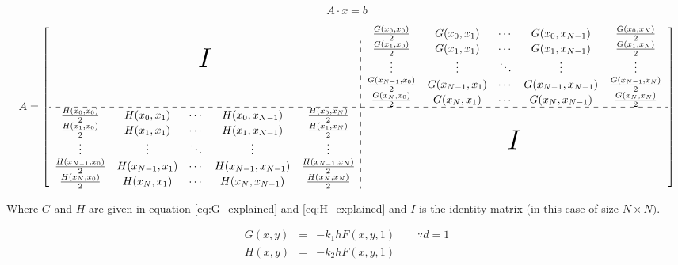 \begin{equation}
A \cdot x = b
\label{eq:equationFormat}
\end{equation}

\begin{landscape}

\begin{equation}
A = 
\left[
\begin{array}{*{5}{c}:*{5}{c}}
\multicolumn{5}{c}{\multirow{5}{*}{\Huge{$I$}}} 
& \frac{G(x_0,x_0)}{2}
& G(x_0,x_1)
& \cdots
& G(x_0,x_{N-1})
& \frac{G(x_0,x_N)}{2} \\

&&&&& \frac{G(x_1,x_0)}{2}
& G(x_1,x_1) 
& \cdots
& G(x_{1},x_{N-1}) 
& \frac{G(x_{1},x_{N})}{2} \\

&&&&& \vdots
& \vdots
& \ddots
& \vdots
& \vdots\\

&&&&& \frac{G(x_{N-1},x_0)}{2}
& G(x_{N-1},x_{1}) 
& \cdots
& G(x_{N-1},x_{N-1}) 
& \frac{G(x_{N-1},x_{N})}{2} \\

&&&&& \frac{G(x_N,x_0)}{2} 
& G(x_{N},x_{1}) 
& \cdots
& G(x_{N},x_{N-1})
& \frac{G(x_{N},x_{N})}{2} \\
 \hdashline
 
\frac{H(x_0,x_0)}{2}
& H(x_0,x_1)
& \cdots
& H(x_0,x_{N-1})
& \frac{H(x_0,x_N)}{2} &
\multicolumn{5}{c}{\multirow{5}{*}{\Huge{$I$}}}
\\

\frac{H(x_1,x_0)}{2}
& H(x_1,x_1) 
& \cdots
& H(x_{1},x_{N-1}) 
& \frac{H(x_{1},x_{N})}{2} \\

\vdots
& \vdots
& \ddots
& \vdots
& \vdots\\

\frac{H(x_{N-1},x_0)}{2}
& H(x_{N-1},x_{1}) 
& \cdots
& H(x_{N-1},x_{N-1}) 
& \frac{H(x_{N-1},x_{N})}{2} \\

\frac{H(x_N,x_0)}{2} 
& H(x_{N},x_{1}) 
& \cdots
& H(x_{N},x_{N-1})
& \frac{H(x_{N},x_{N})}{2} \\
\end{array}
\right]
\label{eq:A_matrix}
\end{equation}

Where $G$ and $H$ are given in equation \ref{eq:G_explained} and \ref{eq:H_explained} and $I$ is the identity matrix (in this case of size $N \times N).$

\begin{eqnarray}
G(x,y) &=&  -k_1 h F(x,y,1) \label{eq:G_explained} \qquad \because d = 1 \\
H(x,y) &=&  -k_2 h F(x,y,1)\label{eq:H_explained}
\end{eqnarray}

\end{landscape}

